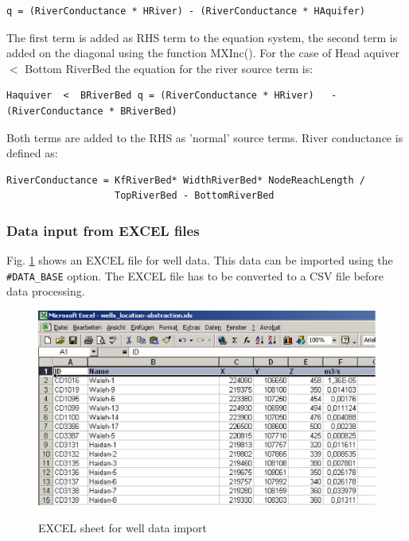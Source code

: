 {\begin{verbatim}
q = (RiverConductance * HRiver) - (RiverConductance * HAquifer)
\end{verbatim}

The first term is added as RHS term to the equation system, the second
term is added on the diagonal using the function MXInc(). For the
case of Head aquiver $ < $ Bottom RiverBed the equation for the
river source term is:

\begin{verbatim}
Haquiver  <  BRiverBed q = (RiverConductance * HRiver)   -
(RiverConductance * BRiverBed)
\end{verbatim}

Both terms are added to the RHS as 'normal' source terms. River conductance is defined as:

\begin{verbatim}
RiverConductance = KfRiverBed* WidthRiverBed* NodeReachLength /
                   TopRiverBed - BottomRiverBed
\end{verbatim}

\subsubsection{Data input from EXCEL files}

Fig. \ref{fig:st_excel} shows an EXCEL file for well data. This
data can be imported using the \texttt{\#DATA\_BASE} option. The
EXCEL file has to be converted to a CSV file before data
processing.

\begin{figure}[htb!]
  \includegraphics[width=12cm]{figures/st_data_base.eps}\\
  \caption{EXCEL sheet for well data import}
  \label{fig:st_excel}
\end{figure}

}
